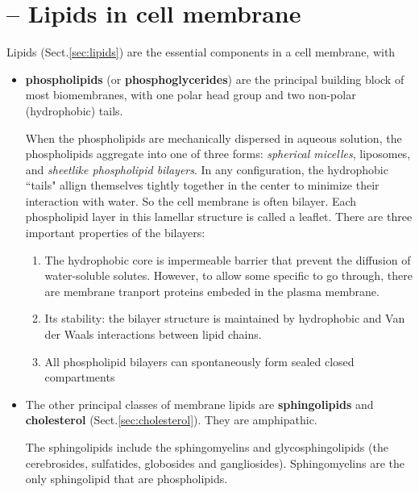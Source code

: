 \section{-- Lipids in cell membrane}
\label{sec:cell-membrane}

Lipids (Sect.\ref{sec:lipids}) are the essential components in a cell membrane,
with
\begin{itemize}
  
   \item {\bf phospholipids} (or {\bf phosphoglycerides}) are the principal
   building block of most biomembranes, with one polar head group and two
   non-polar (hydrophobic) tails.

When the phospholipids are mechanically dispersed in aqueous solution,
the phospholipids aggregate into one of three forms:
{\it spherical micelles}, liposomes, and
{\it sheetlike phospholipid bilayers}. In any configuration, the
hydrophobic ``tails" allign themselves tightly together in the center
to minimize their interaction with water. 
So the cell membrane is often bilayer.
Each phospholipid layer in this lamellar structure is called a leaflet. There
are three important properties of the bilayers:
\begin{enumerate}
\item The hydrophobic core is impermeable barrier that prevent the
  diffusion of water-soluble solutes. However, to allow some specific
  to go through, there are membrane tranport proteins embeded in the
  plasma membrane.
\item Its stability: the bilayer structure is maintained by
  hydrophobic and Van der Waals interactions between lipid chains.
\item All phospholipid bilayers can spontaneously form sealed closed
  compartments

\end{enumerate}

   \item The other principal classes of membrane lipids are {\bf sphingolipids}
   and {\bf cholesterol} (Sect.\ref{sec:cholesterol}). They are amphipathic.

The sphingolipids include the sphingomyelins and glycosphingolipids (the
cerebrosides, sulfatides, globosides and gangliosides). Sphingomyelins are the
only sphingolipid that are phospholipids. 
\end{itemize}

